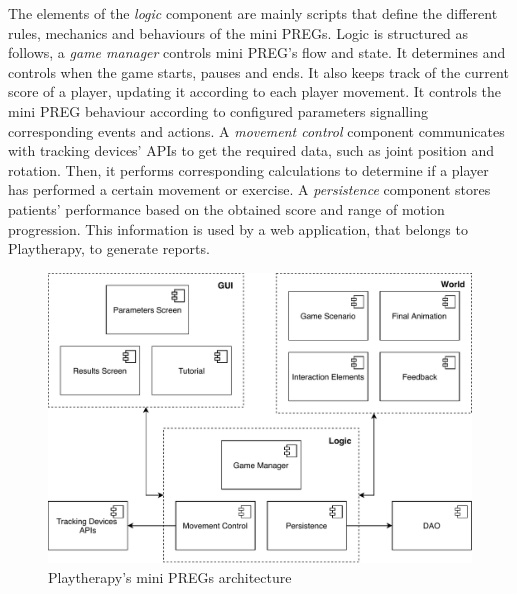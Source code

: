 The elements of the \emph{logic} component are mainly scripts that define the different rules, mechanics and behaviours of the mini \acp{PREG}. Logic is structured as follows, a \emph{game manager} controls mini \ac{PREG}'s flow and state. It determines and controls when the game starts, pauses and ends. It also keeps track of the current score of a player, updating it according to each player movement. It controls the mini \ac{PREG} behaviour according to configured parameters signalling corresponding events and actions. A \emph{movement control} component communicates with tracking devices' APIs to get the required data, such as joint position and rotation. Then, it performs corresponding calculations to determine if a player has performed a certain movement or exercise. A \emph{persistence} component stores patients' performance based on the obtained score and range of motion progression. This information is used by a web application, that belongs to Playtherapy, to generate reports.

\begin{figure}[h]
\centering
\includegraphics[width=.9\linewidth]{gfx/playtherapy/minigame_architecture}
\caption{Playtherapy's mini \acp{PREG} architecture}
\label{fig:mg_arch}
\end{figure}

